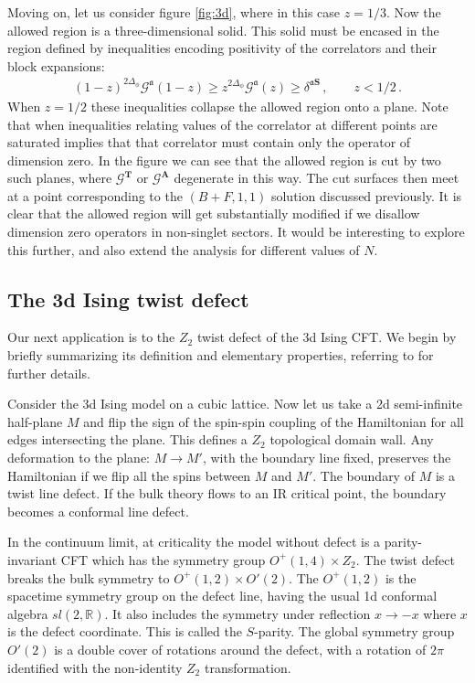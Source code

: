 \documentclass[12pt]{article}
\numberwithin{equation}{section}
\newcommand{\bea}{\begin{eqnarray}}
\newcommand{\eea}{\end{eqnarray}}
\newcommand{\mbf}{\mathbf}
\newcommand{\Df}{{\Delta_\phi}}
\newcommand{\mf}[1]{\mathfrak #1}
\begin{document}
	Moving on, let us consider figure \ref{fig:3d}, where in this case $z=1/3$. Now the allowed region is a three-dimensional solid. This solid must be encased in the region defined by inequalities encoding positivity of the correlators and their block expansions:
	\bea
	(1-z)^{2\Df} \mathcal G^{\mf a}(1-z)\geq z^{2\Df}\mathcal G^{\mf a}(z) \geq \delta^{\mf a \mbf S}\,, \qquad z<1/2\,.
	\eea
	When $z=1/2$ these inequalities collapse the allowed region onto a plane. Note that when inequalities relating values of the correlator at different points are saturated implies that that correlator must contain only the operator of dimension zero. In the figure we can see that the allowed region is cut by two such planes, where $\mathcal G^{\mbf T}$ or $\mathcal G^{\mbf A}$ degenerate in this way. The cut surfaces then meet at a point corresponding to the $(B+F,1,1)$ solution discussed previously. It is clear that the allowed region will get substantially modified if we disallow dimension zero operators in non-singlet sectors. It would be interesting to explore this further, and also extend the analysis for different values of $N$.
	
	\subsection{The 3d Ising twist defect}
	
	Our next application is to the $Z_2$ twist defect of the 3d Ising CFT. We begin by briefly summarizing its definition and elementary properties, referring to \cite{Billo:2013jda, Gaiotto:2013nva} for further details.
	
	Consider the 3d Ising model on a cubic lattice. Now let us take a 2d semi-infinite half-plane $M$ and flip the sign of the spin-spin coupling of the Hamiltonian for all edges intersecting the plane. This defines a $Z_2$ topological domain wall. Any deformation to the plane: $M\to M'$, with the boundary line fixed, preserves the Hamiltonian if we flip all the spins between $M$ and $M'$. The boundary of $M$ is a twist line defect.  If the bulk theory flows to an IR critical point, the boundary becomes a conformal line defect. 
	
	In the continuum limit, at criticality the model without defect is a parity-invariant CFT which has the symmetry group $O^+(1,4)\times Z_2$. The twist defect breaks the bulk symmetry to $O^+(1,2)\times O'(2)$. The $O^+(1,2)$ is the spacetime symmetry group on the defect line, having the usual 1d conformal algebra $sl(2,\mathbb{R})$. It also includes the symmetry under reflection $x\to -x$ where $x$ is the defect coordinate. This is  called the $S$-parity. The global symmetry group $O'(2)$ is a double cover of rotations around the defect, with a rotation of $2\pi$ identified with the non-identity $Z_2$ transformation. 
	
\end{document}
